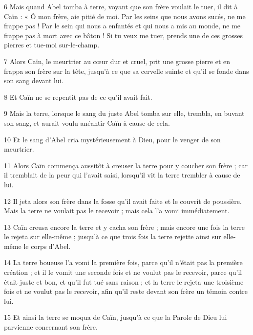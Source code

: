 \par 6 Mais quand Abel tomba à terre, voyant que son frère voulait le tuer, il dit à Caïn : « Ô mon frère, aie pitié de moi. Par les seins que nous avons sucés, ne me frappe pas ! Par le sein qui nous a enfantés et qui nous a mis au monde, ne me frappe pas à mort avec ce bâton ! Si tu veux me tuer, prends une de ces grosses pierres et tue-moi sur-le-champ.

\par 7 Alors Caïn, le meurtrier au cœur dur et cruel, prit une grosse pierre et en frappa son frère sur la tête, jusqu'à ce que sa cervelle suinte et qu'il se fonde dans son sang devant lui.

\par 8 Et Caïn ne se repentit pas de ce qu'il avait fait.

\par 9 Mais la terre, lorsque le sang du juste Abel tomba sur elle, trembla, en buvant son sang, et aurait voulu anéantir Caïn à cause de cela.

\par 10 Et le sang d'Abel cria mystérieusement à Dieu, pour le venger de son meurtrier.

\par 11 Alors Caïn commença aussitôt à creuser la terre pour y coucher son frère ; car il tremblait de la peur qui l'avait saisi, lorsqu'il vit la terre trembler à cause de lui.

\par 12 Il jeta alors son frère dans la fosse qu'il avait faite et le couvrit de poussière. Mais la terre ne voulait pas le recevoir ; mais cela l'a vomi immédiatement.

\par 13 Caïn creusa encore la terre et y cacha son frère ; mais encore une fois la terre le rejeta sur elle-même ; jusqu'à ce que trois fois la terre rejette ainsi sur elle-même le corps d'Abel.

\par 14 La terre boueuse l'a vomi la première fois, parce qu'il n'était pas la première création ; et il le vomit une seconde fois et ne voulut pas le recevoir, parce qu'il était juste et bon, et qu'il fut tué sans raison ; et la terre le rejeta une troisième fois et ne voulut pas le recevoir, afin qu'il reste devant son frère un témoin contre lui.

\par 15 Et ainsi la terre se moqua de Caïn, jusqu'à ce que la Parole de Dieu lui parvienne concernant son frère.


